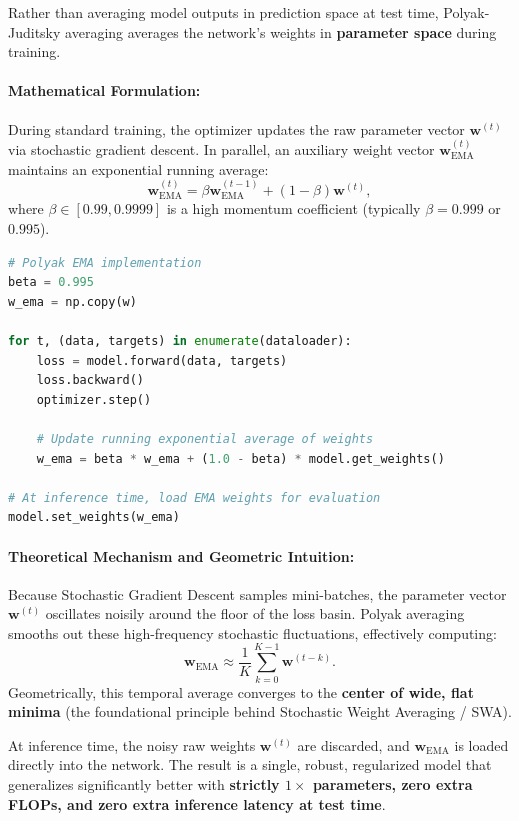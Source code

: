 Rather than averaging model outputs in prediction space at test time, Polyak-Juditsky averaging averages the network's weights in \textbf{parameter space} during training.

\paragraph{Mathematical Formulation:}
During standard training, the optimizer updates the raw parameter vector $\mathbf{w}^{(t)}$ via stochastic gradient descent. In parallel, an auxiliary weight vector $\mathbf{w}_{\text{EMA}}^{(t)}$ maintains an exponential running average:
\begin{equation}
\mathbf{w}_{\text{EMA}}^{(t)} = \beta \mathbf{w}_{\text{EMA}}^{(t-1)} + (1 - \beta) \mathbf{w}^{(t)},
\label{eq:polyak_ema_formula}
\end{equation}
where $\beta \in [0.99, 0.9999]$ is a high momentum coefficient (typically $\beta = 0.999$ or $0.995$).

\begin{lstlisting}[language=Python, caption={Implementing Polyak parameter averaging (EMA) during training.}]
# Polyak EMA implementation
beta = 0.995
w_ema = np.copy(w)

for t, (data, targets) in enumerate(dataloader):
    loss = model.forward(data, targets)
    loss.backward()
    optimizer.step()
    
    # Update running exponential average of weights
    w_ema = beta * w_ema + (1.0 - beta) * model.get_weights()

# At inference time, load EMA weights for evaluation
model.set_weights(w_ema)
\end{lstlisting}

\paragraph{Theoretical Mechanism and Geometric Intuition:}
Because Stochastic Gradient Descent samples mini-batches, the parameter vector $\mathbf{w}^{(t)}$ oscillates noisily around the floor of the loss basin. Polyak averaging smooths out these high-frequency stochastic fluctuations, effectively computing:
\begin{equation}
\mathbf{w}_{\text{EMA}} \approx \frac{1}{K} \sum_{k=0}^{K-1} \mathbf{w}^{(t-k)}.
\end{equation}
Geometrically, this temporal average converges to the \textbf{center of wide, flat minima} (the foundational principle behind Stochastic Weight Averaging / SWA).

At inference time, the noisy raw weights $\mathbf{w}^{(t)}$ are discarded, and $\mathbf{w}_{\text{EMA}}$ is loaded directly into the network. The result is a single, robust, regularized model that generalizes significantly better with \textbf{strictly $1\times$ parameters, zero extra FLOPs, and zero extra inference latency at test time}.
